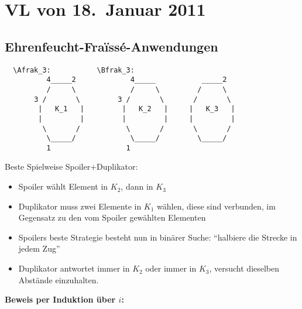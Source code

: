\section{VL von 18.~Januar 2011}

\subsection{Ehrenfeucht-Fraïssé-Anwendungen}

\begin{verbatim}
  \Afrak_3:           \Bfrak_3:
          4_____2             4_____           _____2
          /     \             /     \         /     \
       3 /       \         3 /       \       /       \
        |   K_1   |         |   K_2   |     |   K_3   |
        |         |         |         |     |         |
         \       /           \       /       \       /
          \_____/             \_____/         \_____/
          1                  1
\end{verbatim}

Beste Spielweise Spoiler+Duplikator:

\begin{itemize}
  \item Spoiler wählt Element in $K_2$, dann in $K_3$
  \item Duplikator muss zwei Elemente in $K_1$ wählen, diese sind
  verbunden, im Gegensatz zu den vom Spoiler gewählten Elementen
  \item Spoilers beste Strategie besteht nun in binärer Suche:
  \enquote{halbiere die Strecke in jedem Zug}
  \item Duplikator antwortet immer in $K_2$ oder immer in $K_3$,
  versucht dieselben Abstände einzuhalten.
\end{itemize}

\textbf{Beweis per Induktion über $i$:}


